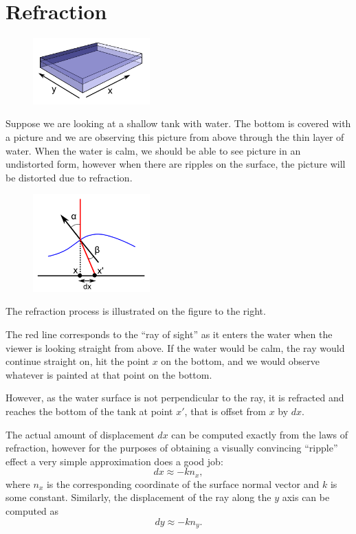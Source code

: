 \documentclass{article}
\begin{document}
\section{Refraction}

\begin{figure}
\includegraphics[width=0.4\textwidth]{rippletank.png}
\end{figure}
Suppose we are looking at a shallow tank with water. The bottom is covered with a picture and we are observing this picture from above through the thin layer of water. When the water is calm, we should be able to see picture in an undistorted form, however when there are ripples on the surface, the picture will be distorted due to refraction.

\begin{figure}
\includegraphics[width=0.4\textwidth]{refraction.png}
\end{figure}
The refraction process is illustrated on the figure to the right.

The red line corresponds to the ``ray of sight'' as it enters the water when the viewer is looking straight from above. If the water would be calm, the ray would continue straight on, hit the point $x$ on the bottom, and we would observe whatever is painted at that point on the bottom. 

However, as the water surface is not perpendicular to the ray, it is refracted and reaches the bottom of the tank at point $x'$, that is offset from $x$ by ${dx}$. 

The actual amount of displacement $dx$ can be computed exactly from the laws of refraction, however for the purposes of obtaining a visually convincing ``ripple'' effect a very simple approximation does a good job:
$$
dx \approx -k n_x,
$$
where $n_x$ is the corresponding coordinate of the surface normal vector and $k$ is some constant. Similarly, the displacement of the ray along the $y$ axis can be computed as
$$
dy \approx -k n_y.
$$
\end{document}
